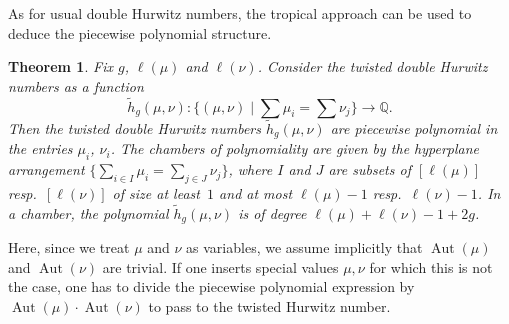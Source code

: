 \documentclass[10pt]{amsart}
\theoremstyle{plain}
\theoremstyle{definition}
\theoremstyle{definition}
\theoremstyle{plain}
\theoremstyle{plain}
\theoremstyle{remark}
\theoremstyle{plain}
\newtheorem{theo}[theo]{Theorem}
\theoremstyle{plain}
\DeclareMathOperator{\Aut}{Aut}
\begin{document}
As for usual double Hurwitz numbers, the tropical approach can be used to deduce the piecewise polynomial structure.

\begin{theo}\label{thm-PP}
Fix $g$, $\ell(\mu)$ and $\ell(\nu)$. Consider the twisted double Hurwitz numbers as a function 
$$\tilde{h}_g(\mu,\nu):\Big\{(\mu,\nu) \mid \sum \mu_i=\sum\nu_j\Big\} \longrightarrow\mathbb{Q}.$$ 
Then the twisted double Hurwitz numbers $\tilde{h}_g(\mu,\nu)$ are piecewise polynomial in the entries $\mu_i$, $\nu_i$. 
The chambers of polynomiality are given by the hyperplane arrangement $\{\sum_{i\in I}\mu_i=\sum_{j\in J}\nu_j\}$, where $I$ and $J$ are subsets of $[\ell(\mu)]$ resp.\ $[\ell(\nu)]$ of size at least~$1$ and at most $\ell(\mu)-1$ resp.\ $\ell(\nu)-1$.
In a chamber, the polynomial $\tilde{h}_g(\mu,\nu)$ is of degree $\ell(\mu)+\ell(\nu)-1+2g$. 
\end{theo}

Here, since we treat $\mu$ and $\nu$ as variables, we assume implicitly that $\Aut(\mu)$ and $\Aut(\nu)$ are trivial. If one inserts special values $\mu,\nu$ for which this is not the case, one has to divide the piecewise polynomial expression by $\Aut(\mu)\cdot \Aut(\nu)$ to pass to the twisted Hurwitz number.
\end{document}
